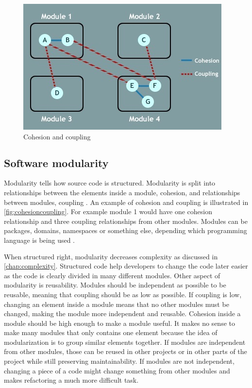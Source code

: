 \begin{figure}[t!]
\centering
\includegraphics[scale=1]{cohesioncoupling.jpg}
\caption{Cohesion and coupling \protect\cite{cohesion2013poonam}}
\label{fig:cohesioncoupling}
\end{figure}

\subsection{Software modularity}
\label{chap:modularity}

Modularity tells how source code is structured. Modularity is split into relationships between the elements inside a module, cohesion, and relationships between modules, coupling \cite{stevens1999structured}. An example of cohesion and coupling is illustrated in \autoref{fig:cohesioncoupling}. For example module 1 would have one cohesion relationship and three coupling relationships from other modules. Modules can be packages, domains, namespaces or something else, depending which programming language is being used \cite{gupta2009package}.

When structured right, modularity decreases complexity as discussed in \autoref{chap:complexity}. Structured code help developers to change the code later easier as the code is clearly divided in many different modules. Other aspect of modularity is reusability. Modules should be independent as possible to be reusable, meaning that coupling should be as low as possible. If coupling is low, changing an element inside a module means that no other modules must be changed, making the module more independent and reusable. Cohesion inside a module should be high enough to make a module useful. It makes no sense to make many modules that only contains one element because the idea of modularization is to group similar elements together. If modules are independent from other modules, those can be reused in other projects or in other parts of the project while still preserving maintainability. If modules are not independent, changing a piece of a code might change something from other modules and makes refactoring a much more difficult task.

